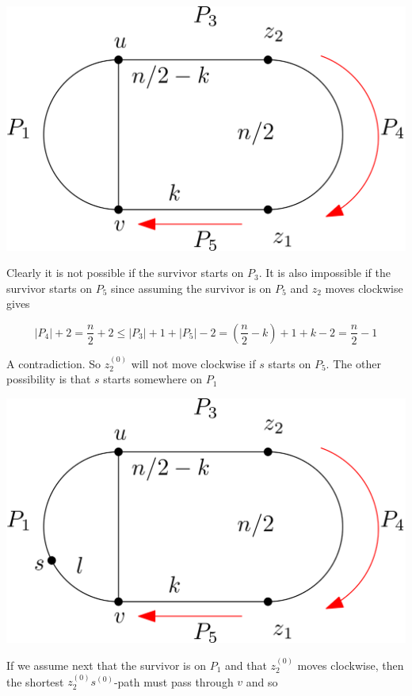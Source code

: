 \documentclass[letterpaper, 10pt]{article}
\begin{document}
\begin{enumerate}
       \begin{center}
        \includegraphics[scale=0.15]{diagramCaseI_1}
       \end{center}

       Clearly it is not possible if the survivor starts on $P_3$.
       It is also impossible if the survivor starts on $P_5$ since assuming the survivor
       is on $P_5$ and $z_2$ moves clockwise gives

       \[ |P_4| + 2 = \frac{n}{2} +2 \leq |P_3| + 1 + |P_5| -2 = \left(\frac{n}{2} - k\right) + 1 + k-2 = \frac{n}{2} -1 \]

       A contradiction.
       So $z_2^{(0)}$ will not move clockwise if $s$ starts on $P_5$. The other
       possibility is that $s$ starts somewhere on $P_1$

       \begin{center}
        \includegraphics[scale=0.15]{diagramCaseI_2}
       \end{center}

       If we assume next that the survivor is on $P_1$ and that $z_2^{(0)}$ moves clockwise, then the shortest
       $z_2^{(0)}s^{(0)}$-path must pass through $v$ and so


\end{enumerate}
\end{document}

